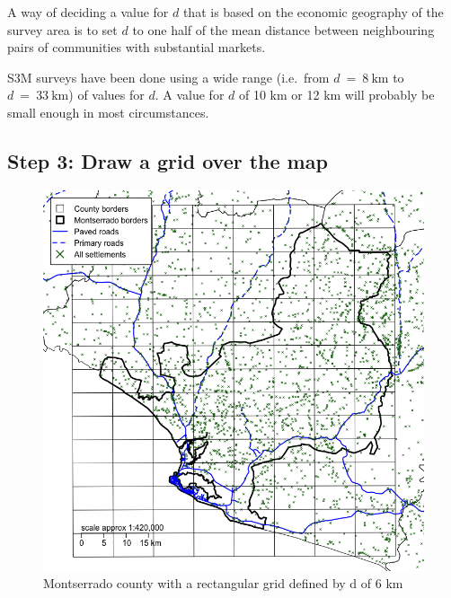 \documentclass[12pt,a4paper]{book}
\theoremstyle{definition}
\theoremstyle{definition}
\theoremstyle{definition}
\theoremstyle{remark}
\begin{document}
A way of deciding a value for \(d\) that is based on the economic
geography of the survey area is to set \(d\) to one half of the mean
distance between neighbouring pairs of communities with substantial
markets.

S3M surveys have been done using a wide range (i.e.~from
\(d ~ = ~ 8 ~ \text{km}\) to \(d ~ = ~ 33 ~ \text{km}\)) of values for
\(d\). A value for \(d\) of 10 km or 12 km will probably be small enough
in most circumstances.

\newpage

\hypertarget{step-3-draw-a-grid-over-the-map}{%
\subsection{Step 3: Draw a grid over the
map}\label{step-3-draw-a-grid-over-the-map}}

\begin{figure}[H]

{\centering \includegraphics{figures/grid1-1} 

}

\caption{Montserrado county with a rectangular grid defined by d of 6 km}\label{fig:grid1}
\end{figure}

\newpage
\end{document}
